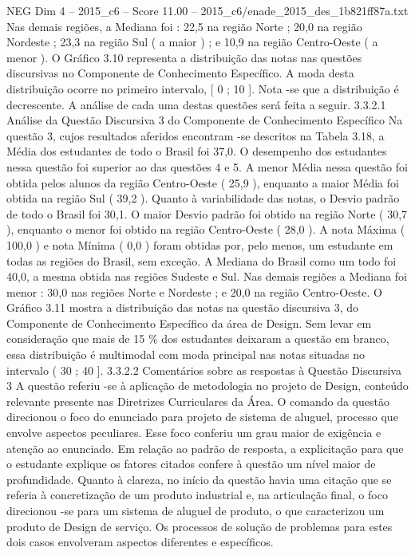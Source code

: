 \begin{textsample}{NEG Dim 4 – 2015\_c6 – Score 11.00 – 2015\_c6/enade\_2015\_des\_1b821ff87a.txt}
Nas demais regiões, a Mediana foi : 22,5 na região Norte ; 20,0 na região Nordeste ; 23,3 na região Sul ( a maior ) ; e 10,9 na região Centro-Oeste ( a menor ).
O Gráfico 3.10 representa a distribuição das notas nas questões discursivas no Componente de Conhecimento Específico.
A moda desta distribuição ocorre no primeiro intervalo, [ 0 ; 10 ].
Nota -se que a distribuição é decrescente.
A análise de cada uma destas questões será feita a seguir. 3.3.2.1 Análise da Questão Discursiva 3 do Componente de Conhecimento Específico Na questão 3, cujos resultados aferidos encontram -se descritos na Tabela 3.18, a Média dos estudantes de todo o Brasil foi 37,0.
O desempenho dos estudantes nessa questão foi superior ao das questões 4 e 5.
A menor Média nessa questão foi obtida pelos alunos da região Centro-Oeste ( 25,9 ), enquanto a maior Média foi obtida na região Sul ( 39,2 ).
Quanto à variabilidade das notas, o Desvio padrão de todo o Brasil foi 30,1.
O maior Desvio padrão foi obtido na região Norte ( 30,7 ), enquanto o menor foi obtido na região Centro-Oeste ( 28,0 ).
A nota Máxima ( 100,0 ) e nota Mínima ( 0,0 ) foram obtidas por, pelo menos, um estudante em todas as regiões do Brasil, sem exceção.
A Mediana do Brasil como um todo foi 40,0, a mesma obtida nas regiões Sudeste e Sul.
Nas demais regiões a Mediana foi menor : 30,0 nas regiões Norte e Nordeste ; e 20,0 na região Centro-Oeste.
O Gráfico 3.11 mostra a distribuição das notas na questão discursiva 3, do Componente de Conhecimento Específico da área de Design.
Sem levar em consideração que mais de 15 \% dos estudantes deixaram a questão em branco, essa distribuição é multimodal com moda principal nas notas situadas no intervalo ( 30 ; 40 ]. 3.3.2.2 Comentários sobre as respostas à Questão Discursiva 3 A questão referiu -se à aplicação de metodologia no projeto de Design, conteúdo relevante presente nas Diretrizes Curriculares da Área.
O comando da questão direcionou o foco do enunciado para projeto de sistema de aluguel, processo que envolve aspectos peculiares.
Esse foco conferiu um grau maior de exigência e atenção ao enunciado.
Em relação ao padrão de resposta, a explicitação para que o estudante explique os fatores citados confere à questão um nível maior de profundidade.
Quanto à clareza, no início da questão havia uma citação que se referia à concretização de um produto industrial e, na articulação final, o foco direcionou -se para um sistema de aluguel de produto, o que caracterizou um produto de Design de serviço.
Os processos de solução de problemas para estes dois casos envolveram aspectos diferentes e específicos.

\end{textsample}
